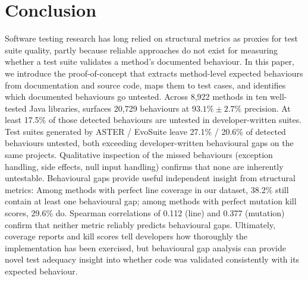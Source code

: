 \section{Conclusion}
\label{sec:summary}

Software testing research has long relied on structural metrics as proxies for test suite quality, partly because reliable approaches do not exist for measuring whether a test suite validates a method's documented behaviour.
In this paper, we introduce the \toolname{} proof-of-concept that extracts method-level expected behaviours from documentation and source code, maps them to test cases, and identifies which documented behaviours go untested. 
Across 8,922 methods in ten well-tested Java libraries, \toolname{} surfaces 20,729 behaviours at $93.1\%\pm2.7\%$ precision. At least 17.5\% of those detected behaviours are untested in developer-written suites. Test suites generated by ASTER / EvoSuite leave 27.1\% / 20.6\% of detected behaviours untested, both exceeding developer-written behavioural gaps on the same projects. 
Qualitative inspection of the missed behaviours (exception handling, side effects, null input handling) confirms that none are inherently untestable.
Behavioural gaps provide useful independent insight from structural metrics: Among methods with perfect line coverage in our dataset, 38.2\% still contain at least one behavioural gap; among methods with perfect mutation kill scores, 29.6\% do. Spearman correlations of 0.112 (line) and 0.377 (mutation) confirm that neither metric reliably predicts behavioural gaps. 
Ultimately, 
coverage reports and kill scores tell developers how thoroughly the implementation has been exercised, but behavioural gap analysis can provide novel test adequacy insight into whether code was validated consistently with its expected behaviour.

